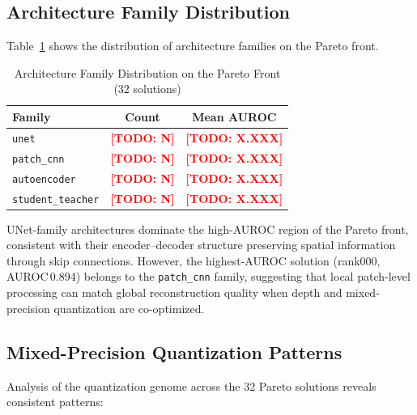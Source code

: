\documentclass[journal]{IEEEtran}
\newcommand{\TODO}[1]{\textcolor{red}{\textbf{[TODO: #1]}}}
\begin{document}
\subsection{Architecture Family Distribution}
\label{sec:family_dist}

Table~\ref{tab:family_dist} shows the distribution of architecture families
on the Pareto front.

\begin{table}[!t]
\caption{Architecture Family Distribution on the Pareto Front (32 solutions)}
\label{tab:family_dist}
\centering
\begin{tabular}{@{}lcc@{}}
\toprule
\textbf{Family} & \textbf{Count} & \textbf{Mean AUROC} \\
\midrule
\texttt{unet}            & \TODO{N} & \TODO{X.XXX} \\
\texttt{patch\_cnn}      & \TODO{N} & \TODO{X.XXX} \\
\texttt{autoencoder}     & \TODO{N} & \TODO{X.XXX} \\
\texttt{student\_teacher}& \TODO{N} & \TODO{X.XXX} \\
\bottomrule
\end{tabular}
\end{table}


\noindent
UNet-family architectures dominate the high-AUROC region of the Pareto front,
consistent with their encoder--decoder structure preserving spatial information
through skip connections.
However, the highest-AUROC solution (rank000, AUROC\,0.894) belongs to the
\texttt{patch\_cnn} family, suggesting that local patch-level processing can
match global reconstruction quality when depth and mixed-precision
quantization are co-optimized.

\subsection{Mixed-Precision Quantization Patterns}
\label{sec:quant_patterns}

Analysis of the quantization genome across the 32 Pareto solutions reveals
consistent patterns:
\end{document}
